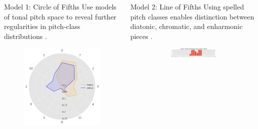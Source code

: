 \documentclass[final]{beamer}
\begin{document}
\begin{frame}[t]
\begin{minipage}[t][.56\textheight][t]{\textwidth}
\begin{columns}[t]
\begin{column}{0.3\textwidth}
      \begin{block}{Model 1: Circle of Fifths}
        Use \alert{models of tonal pitch space} to reveal further regularities in pitch-class distributions \autocite{Harasim2019}.
        \begin{figure}
          \centering
          \includegraphics[width=.9\textwidth]{img/radars}
        \end{figure}
      \end{block}

    \end{column}

    \begin{column}{0.3\textwidth}

      \begin{block}{Model 2: Line of Fifths}
        Using \alert{spelled pitch classes} enables distinction between diatonic, chromatic, and enharmonic pieces \autocite{Gardonyi2002}.
        \begin{figure}
				\centering

				\begin{subfigure}{\textwidth} %
					\includegraphics[width=\textwidth]{img/gmm_josquin.png}
				\end{subfigure}


\end{figure}
\end{block}
\end{column}
\end{columns}
\end{minipage}
\end{frame}
\end{document}
